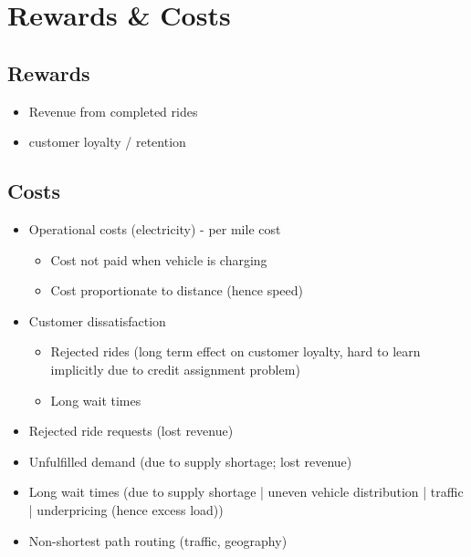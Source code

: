 \documentclass[12pt]{article}
\begin{document}
\newpage
\section*{Rewards \& Costs}
\subsection*{Rewards}
\begin{itemize}
		\item Revenue from completed rides
		\item {} customer loyalty / retention
\end{itemize}
\subsection*{Costs}
\begin{itemize}
		\item Operational costs (electricity) - per mile cost
				\begin{itemize}
						\item Cost not paid when vehicle is charging
						\item Cost proportionate to distance (hence speed)
				\end{itemize}
		\item Customer dissatisfaction
				\begin{itemize}
						\item Rejected rides (long term effect on customer loyalty, hard to learn
								implicitly due to credit assignment problem)
						\item Long wait times
				\end{itemize}
\end{itemize}
\begin{itemize}
		\item Rejected ride requests (lost revenue)
		\item Unfulfilled demand (due to supply shortage; lost revenue)
		\item Long wait times (due to supply shortage | uneven vehicle distribution | traffic |
				underpricing (hence excess load))
		\item Non-shortest path routing (traffic, geography)
\end{itemize}

\newpage
\end{document}

